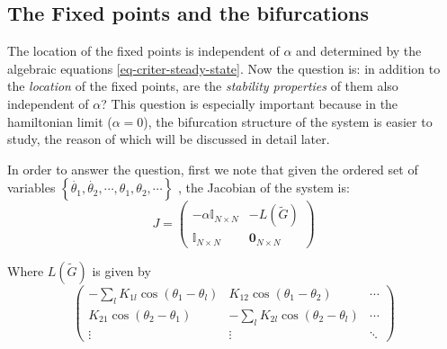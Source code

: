 \documentclass[10pt,aps,pra,twocolumn,superscriptaddress]{revtex4-1}
\begin{document}
\subsection{The Fixed points and the bifurcations}
The location of the fixed points is independent of $\alpha$ and determined by 
the algebraic equations \eqref{eq-criter-steady-state}. Now the question is: in addition to the \emph{location} of the fixed points, are 
the \emph{stability properties} of them  also independent of $\alpha$? This question is 
especially important because in the hamiltonian limit ($\alpha=0$), the bifurcation structure of the system 
is easier to study, the reason of which will be discussed in detail later.  
  
In order to answer the question, first we note that given the ordered set  
of variables 
$\left\{\dot{\theta_1},\dot{\theta_2},\cdots,\theta_1,\theta_2,\cdots\right\}$
, the Jacobian of the system is:
\begin{equation}
\label{eq-gen-jacobian}
J=\left(
\begin{array}{c|c}
-\alpha\mathbb{I}_{N\times N} & -L(\tilde{G})\\
\hline
\mathbb{I}_{N\times N} & \mathbf{0}_{N\times N}
\end{array}
\right)
\end{equation}

Where $L(\tilde{G})$ is given by
\[
\begin{pmatrix}
-\sum_l K_{1l} \cos{(\theta_1-\theta_l)} & K_{12}\cos{(\theta_1-\theta_2)} & \cdots \\
K_{21}\cos{(\theta_2-\theta_1)} & -\sum_l K_{2l} \cos{(\theta_2-\theta_l)} & \cdots \\
\vdots & \vdots  & \ddots 
\end{pmatrix}
\]
\end{document}
